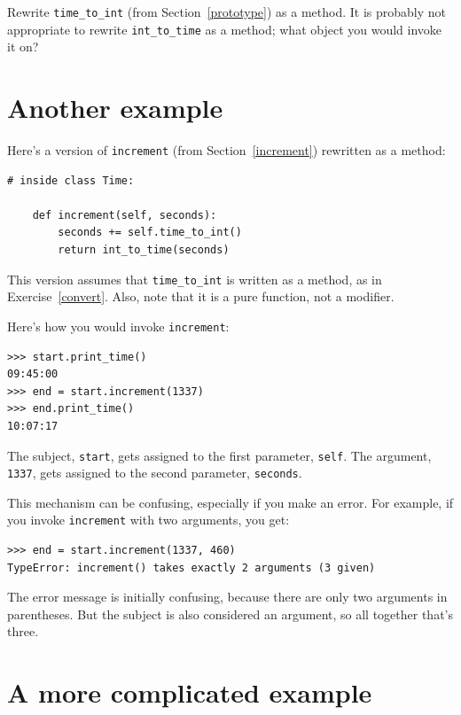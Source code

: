 \documentclass[10pt]{book}
\begin{document}
\begin{exercise}
\label{convert}

Rewrite \verb"time_to_int" (from Section~\ref{prototype}) as a method.
It is probably not appropriate to rewrite \verb"int_to_time" as a
method; what object you would invoke it on?

\end{exercise}


\section{Another example}

Here's a version of {\tt increment} (from Section~\ref{increment})
rewritten as a method:

\begin{verbatim}
# inside class Time:

    def increment(self, seconds):
        seconds += self.time_to_int()
        return int_to_time(seconds)
\end{verbatim}
%
This version assumes that \verb"time_to_int" is written
as a method, as in Exercise~\ref{convert}.  Also, note that
it is a pure function, not a modifier.

Here's how you would invoke {\tt increment}:

\begin{verbatim}
>>> start.print_time()
09:45:00
>>> end = start.increment(1337)
>>> end.print_time()
10:07:17
\end{verbatim}
%
The subject, {\tt start}, gets assigned to the first parameter,
{\tt self}.  The argument, {\tt 1337}, gets assigned to the
second parameter, {\tt seconds}.

This mechanism can be confusing, especially if you make an error.
For example, if you invoke {\tt increment} with two arguments, you
get:

\begin{verbatim}
>>> end = start.increment(1337, 460)
TypeError: increment() takes exactly 2 arguments (3 given)
\end{verbatim}
%
The error message is initially confusing, because there are
only two arguments in parentheses.  But the subject is also
considered an argument, so all together that's three.


\section{A more complicated example}
\end{document}
